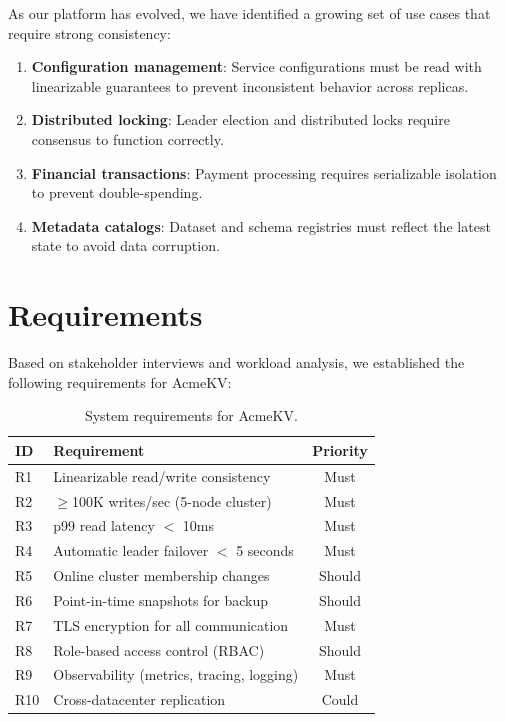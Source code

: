 \documentclass[12pt,a4paper]{report}
\begin{document}
As our platform has evolved, we have identified a growing set of use cases that require strong consistency:
\begin{enumerate}[itemsep=4pt]
  \item \textbf{Configuration management}: Service configurations must be read with linearizable guarantees to prevent inconsistent behavior across replicas.
  \item \textbf{Distributed locking}: Leader election and distributed locks require consensus to function correctly.
  \item \textbf{Financial transactions}: Payment processing requires serializable isolation to prevent double-spending.
  \item \textbf{Metadata catalogs}: Dataset and schema registries must reflect the latest state to avoid data corruption.
\end{enumerate}

\section{Requirements}

Based on stakeholder interviews and workload analysis, we established the following requirements for AcmeKV:

\begin{table}[H]
\centering
\caption{System requirements for AcmeKV.}
\label{tab:requirements}
\begin{tabular}{@{}llc@{}}
\toprule
\textbf{ID} & \textbf{Requirement} & \textbf{Priority} \\
\midrule
R1 & Linearizable read/write consistency & Must \\
R2 & $\geq$100K writes/sec (5-node cluster) & Must \\
R3 & p99 read latency $<$ 10ms & Must \\
R4 & Automatic leader failover $<$ 5 seconds & Must \\
R5 & Online cluster membership changes & Should \\
R6 & Point-in-time snapshots for backup & Should \\
R7 & TLS encryption for all communication & Must \\
R8 & Role-based access control (RBAC) & Should \\
R9 & Observability (metrics, tracing, logging) & Must \\
R10 & Cross-datacenter replication & Could \\
\bottomrule
\end{tabular}
\end{table}
\end{document}
